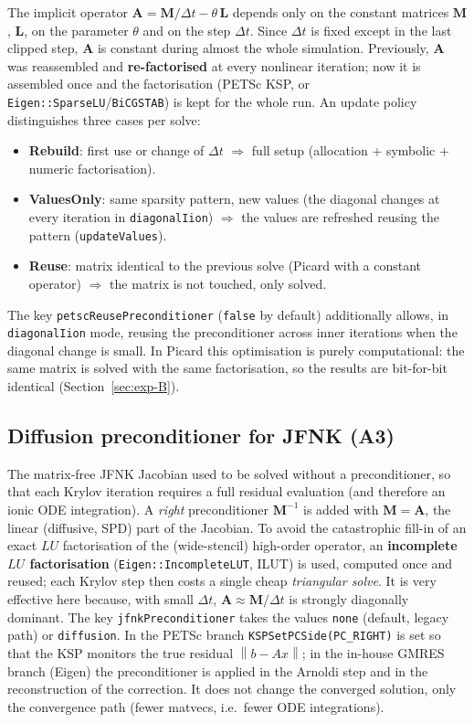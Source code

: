 \documentclass[11pt,a4paper]{article}
\newcommand{\code}[1]{\texttt{\small #1}}
\newcommand{\Mmass}{\mathbf{M}}
\newcommand{\Lop}{\mathbf{L}}
\newcommand{\Aimp}{\mathbf{A}}
\newcommand{\norm}[1]{\left\lVert #1 \right\rVert}
\newcommand{\dictkey}[1]{\textcolor{black!60!green}{\texttt{\footnotesize #1}}}
\begin{document}
The implicit operator $\Aimp = \Mmass/\Delta t - \theta\,\Lop$ depends only on the
constant matrices $\Mmass$, $\Lop$, on the parameter $\theta$ and on the step $\Delta t$.
Since $\Delta t$ is fixed except in the last clipped step, $\Aimp$ is constant
during almost the whole simulation. Previously, $\Aimp$ was reassembled and
\textbf{re-factorised} at every nonlinear iteration; now it is assembled once and the
factorisation (PETSc KSP, or \code{Eigen::SparseLU}/\code{BiCGSTAB}) is kept
for the whole run. An update policy distinguishes three cases per solve:
\begin{itemize}[nosep]
  \item \textbf{Rebuild}: first use or change of $\Delta t$ $\Rightarrow$ full
        setup (allocation + symbolic + numeric factorisation).
  \item \textbf{ValuesOnly}: same sparsity pattern, new values (the
        diagonal changes at every iteration in \dictkey{diagonalIion}) $\Rightarrow$ the
        values are refreshed reusing the pattern (\code{updateValues}).
  \item \textbf{Reuse}: matrix identical to the previous solve (Picard with a constant
        operator) $\Rightarrow$ the matrix is not touched, only solved.
\end{itemize}
The key \dictkey{petscReusePreconditioner} (\code{false} by default) additionally
allows, in \dictkey{diagonalIion} mode, reusing the preconditioner across
inner iterations when the diagonal change is small. In Picard this
optimisation is purely computational: the same matrix is solved with the same
factorisation, so the results are bit-for-bit identical
(Section~\ref{sec:exp-B}).

\subsection{Diffusion preconditioner for JFNK (A3)}
\label{sec:optim-A3}

The matrix-free JFNK Jacobian used to be solved without a preconditioner, so that
each Krylov iteration requires a full residual evaluation (and therefore
an ionic ODE integration). A \emph{right} preconditioner
$\mathbf{M}^{-1}$ is added with $\mathbf{M}=\Aimp$, the linear (diffusive, SPD) part
of the Jacobian. To avoid the catastrophic fill-in of an exact $LU$ factorisation
of the (wide-stencil) high-order operator, an \textbf{incomplete
$LU$ factorisation} (\code{Eigen::IncompleteLUT}, ILUT) is used, computed once and
reused; each Krylov step then costs a single cheap \emph{triangular solve}.
It is very effective here because, with small $\Delta t$, $\Aimp\approx
\Mmass/\Delta t$ is strongly diagonally dominant. The key
\dictkey{jfnkPreconditioner} takes the values \code{none} (default, legacy
path) or \code{diffusion}. In the PETSc branch \code{KSPSetPCSide(PC\_RIGHT)} is set
so that the KSP monitors the true residual $\norm{b - Ax}$; in the
in-house GMRES branch (Eigen) the preconditioner is applied in the Arnoldi step and in
the reconstruction of the correction. It does not change the converged solution, only the
convergence path (fewer matvecs, i.e.\ fewer ODE integrations).
\end{document}
